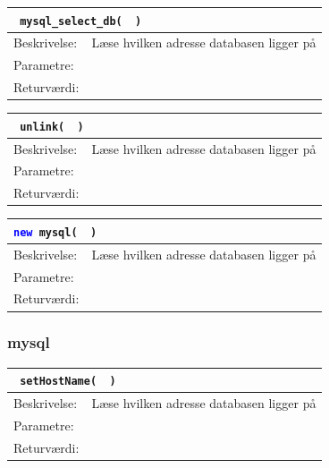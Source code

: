 \begin{table}[H]
\begin{tabular}{l p{12.5cm}}
\multicolumn{2}{l}{\texttt{\textcolor{blue}{} mysql\_select\_db( \textcolor{blue}{} )}} \\
\hline
Beskrivelse:&Læse hvilken adresse databasen ligger på\\
Parametre:&\\
Returværdi:&\\
\end{tabular}
\end{table}

\begin{table}[H]
\begin{tabular}{l p{12.5cm}}
\multicolumn{2}{l}{\texttt{\textcolor{blue}{} unlink( \textcolor{blue}{} )}} \\
\hline
Beskrivelse:&Læse hvilken adresse databasen ligger på\\
Parametre:&\\
Returværdi:&\\
\end{tabular}
\end{table}

\begin{table}[H]
\begin{tabular}{l p{12.5cm}}
\multicolumn{2}{l}{\texttt{\textcolor{blue}{new} mysql( \textcolor{blue}{} )}} \\
\hline
Beskrivelse:&Læse hvilken adresse databasen ligger på\\
Parametre:&\\
Returværdi:&\\
\end{tabular}
\end{table}

\subsubsection{mysql}
\begin{table}[H]
\begin{tabular}{l p{12.5cm}}
\multicolumn{2}{l}{\texttt{\textcolor{blue}{} setHostName( \textcolor{blue}{} )}} \\
\hline
Beskrivelse:&Læse hvilken adresse databasen ligger på\\
Parametre:&\\
Returværdi:&\\
\end{tabular}
\end{table}

